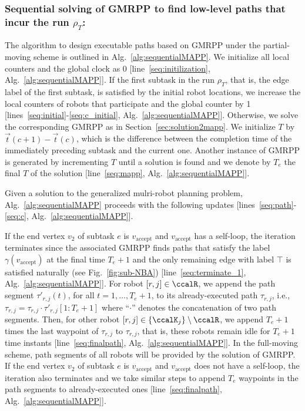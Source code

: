 \documentclass[Afour,sageh,times]{sagej}
\newcommand{\vertex}[1]{v_{\text{#1}}}
\begin{document}
{ \subsubsection{Sequential solving of  GMRPP to find low-level paths that incur the run $\rho_T$:}
The algorithm to design executable paths based on GMRPP under the  partial-moving scheme is outlined in Alg.~\ref{alg:sequentialMAPP}.  We initialize all local counters and the global clock as 0 [line~\ref{seq:initilization}, Alg.~\ref{alg:sequentialMAPP}].
If the first subtask in the run $\rho_T$, that is, the edge label of the first subtask,  is satisfied by the initial  robot locations, we increase the local counters of robots that participate  and the global counter by 1 [lines~\ref{seq:initial}-\ref{seq:c_initial}, Alg.~\ref{alg:sequentialMAPP}]. Otherwise, we solve the corresponding GMRPP as in Section~\ref{sec:solution2mapp}.  We initialize $T$ by $\vec{t}(c+1) - \vec{t}(c)$,  which is the difference between the completion time of the immediately preceding subtask and the current one. Another instance of GMRPP is generated by incrementing $T$ until a solution is found and we denote by $T_e$  the final $T$ of the solution [line~\ref{seq:mapp}, Alg.~\ref{alg:sequentialMAPP}]. {Given a solution to the generalized mulri-robot planning problem, Alg.~\ref{alg:sequentialMAPP} proceeds with the following updates [lines~\ref{seq:path}-\ref{seq:c}, Alg.~\ref{alg:sequentialMAPP}].

{If the  end vertex $v_2$ of subtask $e$ is $v_{\text{accept}}$ and $\vertex{accept}$ has a self-loop, the iteration terminates since the associated GMRPP finds paths that satisfy the label $\gamma(v_{\text{accept}})$ at the final time $T_e + 1$ and the only remaining edge with label $\top$ is satisfied naturally (see Fig.~\ref{fig:sub-NBA}) [line~\ref{seq:terminate_1}, Alg.~\ref{alg:sequentialMAPP}]. For robot $[r, j] \in \ccalR$, we append the path segment $\tau'_{r,j}(t)$, for all $t = 1, \ldots, T_e+1$, to its already-executed path $\tau_{r,j}$, i.e.,  $\tau_{r,j} = \tau_{r,j} \cdot \tau'_{r,j}[1:T_e+1]$ where ``$\cdot$'' denotes the concatenation of two path segments. Then, for other robot $[r,j] \in \{\ccalK_j\}\setminus \ccalR$, we  append  $T_e+1$ times  the last waypoint of  $\tau_{r,j}$  to $\tau_{r,j}$, that is, these robots  remain idle for $T_e+1$ time instants [line~\ref{seq:finalpath}, Alg.~\ref{alg:sequentialMAPP}]. In the full-moving scheme, path segments of all robots will be provided by the solution of GMRPP. If the  end vertex $v_2$ of subtask $e$ is $v_{\text{accept}}$ and $\vertex{accept}$ does not have a self-loop, the iteration also terminates and  we take similar steps to append $T_e$ waypoints in the path segments to already-executed ones [line~\ref{seq:finalpath}, Alg.~\ref{alg:sequentialMAPP}].

}}}
\end{document}

